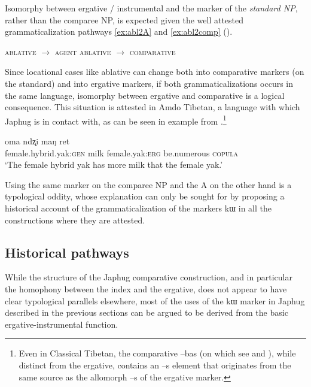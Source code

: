 \documentclass[oldfontcommands,oneside,a4paper,11pt]{article}
\newcommand{\ipa}[1]{{\phon #1}} %
\begin{document}
Isomorphy between ergative / instrumental and the marker of the \textit{standard NP}, rather than the comparee NP, is expected given the well attested grammaticalization pathways \ref{ex:abl2A} and \ref{ex:abl2comp} (\citealt[29]{heine-kuteva02}).
 


\begin{exe}
\ex \label{ex:abl2A}
\glt \textsc{ablative} $\rightarrow$ \textsc{agent} 
\ex \label{ex:abl2comp}
\glt \textsc{ablative} $\rightarrow$ \textsc{comparative}
\end{exe}

Since   locational cases like ablative can change both into comparative markers (on the standard) and  into ergative markers, if both grammaticalizations occurs in the same language, isomorphy between ergative and comparative is a logical consequence. This situation is attested in Amdo Tibetan, a language with which Japhug is in contact with, as can be seen in example from \citet[255]{skalbzang02dialectes}.\footnote{Even in Classical Tibetan, the comparative \ipa{--bas} (on which see \citealt{tournadre10cases} and \citealt{hill12bas}), while distinct from the ergative, contains an \ipa{--s}  element that originates from the same source as the allomorph \ipa{--s} of the ergative marker.}

\begin{exe}
\ex \label{ex:vbris}
\gll \ipa{ndzomi}  	\ipa{oma}  	\ipa{ndʐi}  	\ipa{maŋ}  	\ipa{ret}  \\
female.hybrid.yak:\textsc{gen} milk female.yak:\textsc{erg} be.numerous \textsc{copula} \\
\glt `The female hybrid yak has more milk that the female yak.'
\end{exe}

Using the same marker on the comparee NP and the A on the other hand is a typological oddity, whose explanation can only be sought for by proposing a historical account of the grammaticalization of the markers \ipa{kɯ} in all the constructions where they are attested.
 

 
\subsection{Historical pathways}


While the structure of the Japhug comparative construction, and in particular the homophony between the index and the ergative, does not appear to have clear typological parallels elsewhere, most of the uses of the \ipa{kɯ} marker in Japhug described in the previous sections can be argued to be derived from the basic ergative-instrumental function. 
\end{document}
